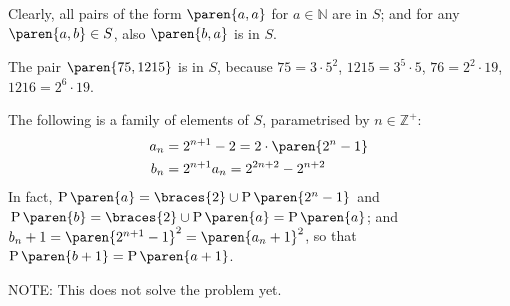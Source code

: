 Clearly, all pairs of the form $\paren{a, a}$ for $a \in \mathbb{N}$ are in $S$;
and for any $\paren{a, b} \in S$, also $\paren{b, a}$ is in $S$.

The pair $\paren{75, 1215}$ is in $S$, because
$75 = 3   \cdot 5^2$, $1215 = 3^5 \cdot 5$,
$76 = 2^2 \cdot 19$,  $1216 = 2^6 \cdot 19$.

The following is a family of elements of $S$,
parametrised by $n \in \mathbb{Z}^{+}$:
\begin{align*}
 a_n &= 2^{n + 1} - 2
      = 2 \cdot \paren{2^n - 1} \mspace{2mu} \\
 b_n &= 2^{n + 1} a_n
      = 2^{2 n + 2} - 2^{n + 2}
\end{align*}
In fact,
$\operatorname{P}\paren{a} = \braces{2} \cup \operatorname{P}\paren{2^n - 1} \mspace{2mu}$
and $\mspace{2mu} \operatorname{P}\paren{b} = \braces{2} \cup \operatorname{P}\paren{a} = \operatorname{P}\paren{a}$;
and $b_n + 1 = \paren{2^{n + 1} - 1}^2 = \paren{a_n + 1}^2$,
so that $\operatorname{P}\paren{b + 1} = \operatorname{P}\paren{a + 1}$.

\vspace{2ex}
NOTE: This does not solve the problem yet.
